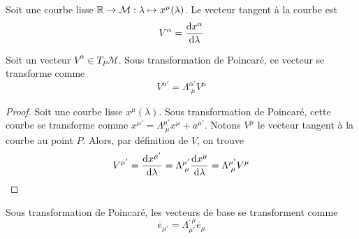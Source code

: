 \begin{theoremframe}
    \begin{defi}
        Soit une courbe lisse $\mathbb{R} \to \mathcal{M}: \lambda \mapsto x^\mu (\lambda)$. Le vecteur tangent à la courbe est
        \begin{equation}
            V^\alpha = \frac{\mathrm{d} x^\alpha}{\mathrm{d} \lambda}
        \end{equation}
    \end{defi}
\end{theoremframe}
\begin{theoremframe}
\begin{propri}
    Soit un vecteur $V^\alpha\in T_P\mathcal{M}$. Sous transformation de Poincaré, ce vecteur se transforme comme
    \begin{equation}
        V^{\alpha'} = \Lambda^{\alpha'}_{\; \mu} V^\mu
    \end{equation}
\end{propri}
\end{theoremframe}
\begin{proof}
    Soit une courbe lisse $x^\mu(\lambda)$. Sous transformation de Poincaré, cette courbe se transforme comme $x^{\mu'} = \Lambda^{\mu'}_{\; \mu} x^\mu + a^{\mu'}$. Notons $V^\mu$ le vecteur tangent à la courbe au point $P$. Alors, par définition de $V$, on trouve
    \begin{align}
        V^{\mu'} = \frac{\mathrm{d} x^{\mu'}}{\mathrm{d} \lambda} = \Lambda^{\mu'}_{\; \mu} \frac{\mathrm{d} x^{\mu}}{\mathrm{d} \lambda} = \Lambda^{\mu'}_{\; \mu} V^\mu
    \end{align}
\end{proof}
\begin{theoremframe}
    \begin{propri}
        Sous transformation de Poincaré, les vecteurs de base se transforment comme
        \begin{equation}
            \overline{e}_{\mu '} = \Lambda^{\cdot\,\mu}_{\mu'}\overline{e}_{\mu}
        \end{equation}
    \end{propri}
\end{theoremframe}
